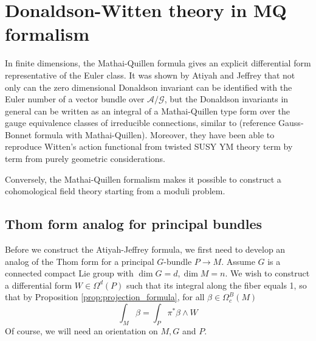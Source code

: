 \chapter{Donaldson-Witten theory in MQ formalism}
\label{chapter4}
In finite dimensions, the Mathai-Quillen formula gives an explicit differential
form representative of the Euler class. 
It was shown by Atiyah and
Jeffrey \cite{atiyahlagrangians} that not only can the zero dimensional
Donaldson invariant can be identified with the Euler number of a vector bundle
over $\mathcal{A} /\mathcal{G}$, but the Donaldson invariants in general can be
written as an integral of a Mathai-Quillen type form over the gauge equivalence
classes of irreducible connections, similar to (reference Gauss-Bonnet formula
with Mathai-Quillen).
Moreover, they have been able to reproduce Witten's
action functional from twisted SUSY YM theory term by term from purely geometric
considerations.

Conversely,
the Mathai-Quillen formalism makes it possible to construct a cohomological field
theory starting from a moduli problem.

\section{Thom form analog for principal bundles}
Before we construct the Atiyah-Jeffrey formula, we first need to develop an
analog of the Thom form for a principal $G$-bundle $P\to M$. Assume $G$ is
a connected compact Lie group with $\dim G = d, \dim M = n$. 
We wish to construct a differential form  $W\in \Omega^d(P)$
such that its integral along the fiber equals 1, so that by 
Proposition \ref{prop:projection_formula}, for all $\beta\in \Omega_c^B(M)$
\begin{equation} \label{eq:principal_thom_local}
	\int_M \beta = \int_P \pi^*\beta \wedge W
\end{equation}
Of course, we will need an orientation on $M,G$ and $P$.    

